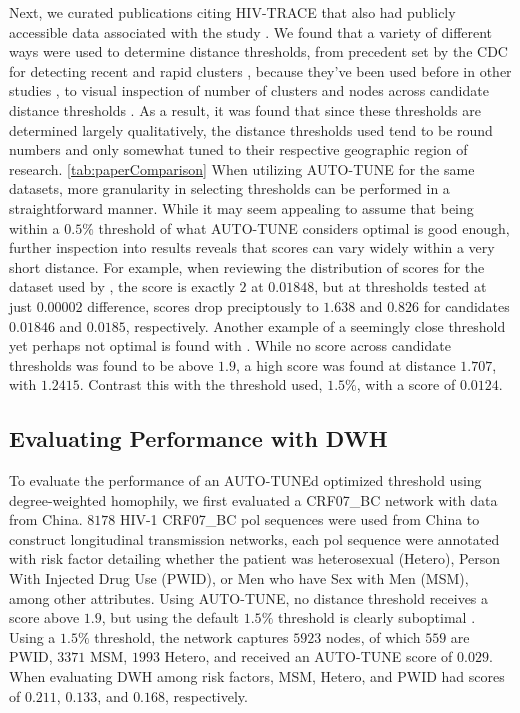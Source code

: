 \documentclass[utf8]{FrontiersinHarvard} %
\begin{document}
Next, we curated publications citing HIV-TRACE that also had publicly
accessible data associated with the study \cite{rhee_national_2019,
brenner_role_2021, h_acquisition_2021, liu_dynamics_2020, bbosa_short_2020,
yan_central_2020, dalai_combining_2018, sivay_hiv-1_2018}. We found that a
variety of different ways were used to determine distance thresholds, from
precedent set by the CDC for detecting recent and rapid clusters
\cite{yan_central_2020}, because they've been used before in other studies
\cite{sivay_hiv-1_2018}, to visual inspection of number of clusters and nodes
across candidate distance thresholds \cite{liu_dynamics_2020}. As a result, it
was found that since these thresholds are determined largely qualitatively, the
distance thresholds used tend to be round numbers and only somewhat tuned to
their respective geographic region of research. \autoref{tab:paperComparison}
When utilizing AUTO-TUNE for the same datasets, more granularity in selecting
thresholds can be performed in a straightforward manner. While it may seem
appealing to assume that being within a $0.5\%$ threshold of what AUTO-TUNE
considers optimal is good enough, further inspection into results reveals that
scores can vary widely within a very short distance. For example, when
reviewing the distribution of scores for the dataset used by
\cite{dalai_combining_2018}, the score is exactly $2$ at $0.01848$, but at
thresholds tested at just $0.00002$ difference, scores drop preciptously to
$1.638$ and $0.826$ for candidates $0.01846$ and $0.0185$, respectively.
Another example of a seemingly close threshold yet perhaps not optimal is found
with \cite{bbosa_short_2020}. While no score across candidate thresholds was
found to be above $1.9$, a high score was found at distance $1.707$, with
$1.2415$. Contrast this with the threshold used, $1.5\%$, with a score of
$0.0124$.

\subsection{Evaluating Performance with DWH}

To evaluate the performance of an AUTO-TUNEd optimized threshold using
degree-weighted homophily, we first evaluated a CRF07\_BC network with data
from China. $8178$ HIV-1 CRF07\_BC pol sequences were used from China to
construct longitudinal transmission networks, each pol sequence were annotated
with risk factor detailing whether the patient was heterosexual (Hetero),
Person With Injected Drug Use (PWID), or Men who have Sex with Men (MSM), among
other attributes. Using AUTO-TUNE, no distance threshold receives a score above
$1.9$, but using the default $1.5\%$ threshold is clearly suboptimal
\label{fig:chinaScorePlot}. Using a $1.5\%$ threshold, the network captures
$5923$ nodes, of which $559$ are PWID, $3371$ MSM, $1993$ Hetero, and received
an AUTO-TUNE score of $0.029$. When evaluating DWH among risk factors, MSM,
Hetero, and PWID had scores of $0.211$, $0.133$, and $0.168$, respectively. 
\end{document}
